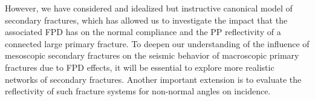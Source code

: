 \documentclass[draft]{agujournal2019}
\begin{document}
However, we have considered and idealized but instructive canonical model of secondary fractures, which has allowed us to investigate the impact that the associated FPD has on the normal compliance and the PP reflectivity of a connected large primary fracture. To deepen our understanding of the influence of mesoscopic secondary fractures on the seismic behavior of macroscopic primary fractures due to FPD effects, it will be essential to explore more realistic networks of secondary fractures. Another important extension is to evaluate the reflectivity of such fracture systems for non-normal angles on incidence.





%
%
%
%
%
%
%
%
%
%

%
%
\end{document}

